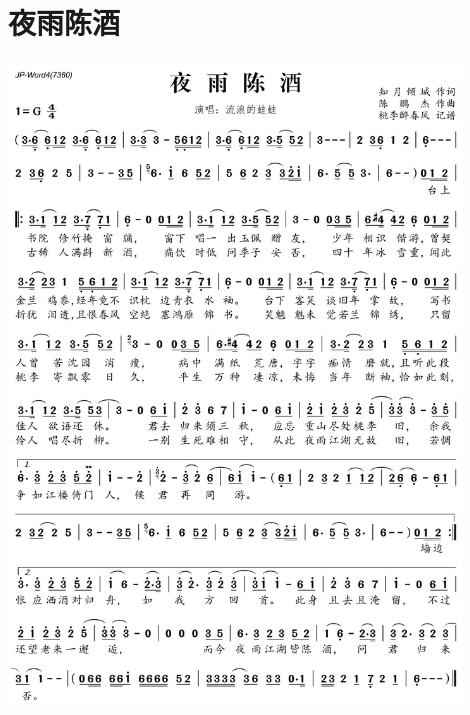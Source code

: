 \documentclass[cn,pad,twocol]{elegantbook}
\begin{document}
\section{夜雨陈酒}\includegraphics[width=0.9\textwidth]{rpi400/20210124-夜雨陈酒.jpg}
\end{document}
